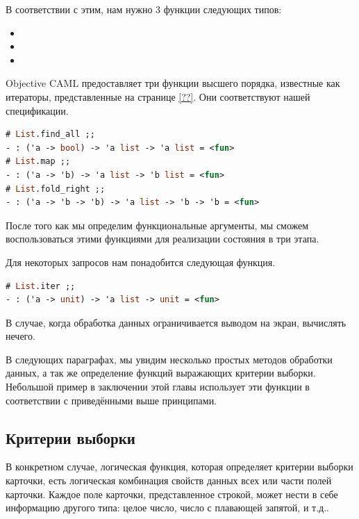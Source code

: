 В соответствии с этим, нам нужно 3 функции следующих типов:

\begin{itemize}
	\item {}
	
	\item {}
	
	\item {}
\end{itemize}

Objective CAML предоставляет три функции высшего порядка, известные как 
итераторы, представленные на странице \ref{??}. Они соответствуют нашей 
спецификации.

\begin{lstlisting}[language=OCaml]
# List.find_all ;;
- : ('a -> bool) -> 'a list -> 'a list = <fun>
# List.map ;;
- : ('a -> 'b) -> 'a list -> 'b list = <fun>
# List.fold_right ;;
- : ('a -> 'b -> 'b) -> 'a list -> 'b -> 'b = <fun>
\end{lstlisting}

После того как мы определим функциональные аргументы, мы сможем воспользоваться 
этими функциями для реализации состояния в три этапа.

Для некоторых запросов нам понадобится следующая функция.

\begin{lstlisting}[language=OCaml]
# List.iter ;;
- : ('a -> unit) -> 'a list -> unit = <fun>
\end{lstlisting}

В случае, когда обработка данных ограничивается выводом на экран, вычислять 
нечего.

В следующих параграфах, мы увидим несколько простых методов обработки данных, а 
так же определение функций выражающих критерии выборки. Небольшой пример в 
заключении этой главы использует эти функции в соответствии с приведёнными выше 
принципами.

\subsection{Критерии выборки}
\label{subsec:selection_criteria}

В конкретном случае, логическая функция, которая определяет критерии выборки 
карточки, есть логическая комбинация свойств данных всех или части полей 
карточки. Каждое поле карточки, представленное строкой, может нести в себе 
информацию другого типа: целое число, число с плавающей запятой, и т.д..

